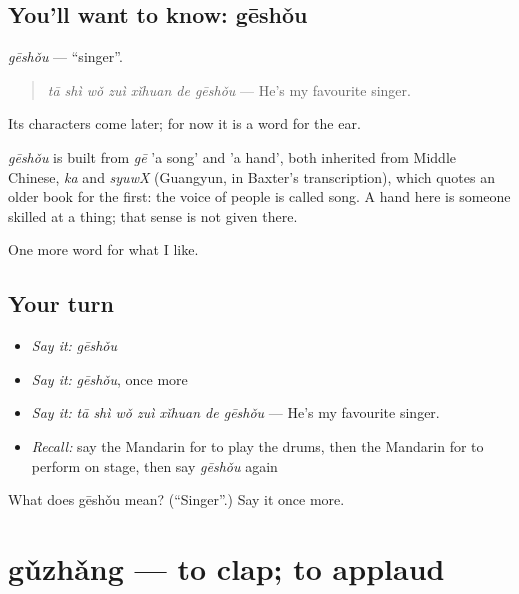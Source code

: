 \subsection*{You'll want to know: gēshǒu}
\emph{gēshǒu} — \textquotedblleft{}singer\textquotedblright{}.

\begin{quote}
\emph{tā shì wǒ zuì xǐhuan de gēshǒu} — He's my favourite singer.
\end{quote}

Its characters come later; for now it is a word for the ear.

\begin{cousinweb}
\emph{gēshǒu} is built from \emph{gē} 'a song' and  'a hand', both inherited from Middle Chinese, \emph{ka} and \emph{syuwX} (Guangyun, in Baxter's transcription), which quotes an older book for the first: the voice of people is called song. A hand here is someone skilled at a thing; that sense is not given there.
\end{cousinweb}

\begin{grammarlens}[title={What you've built}]
One more word for what I like.
\end{grammarlens}

\subsection*{Your turn}
\begin{itemize}
\raggedright
  \item \emph{Say it:} \emph{gēshǒu}
  \item \emph{Say it:} \emph{gēshǒu}, once more
  \item \emph{Say it:} \emph{tā shì wǒ zuì xǐhuan de gēshǒu} — He's my favourite singer.
  \item \emph{Recall:} say the Mandarin for to play the drums, then the Mandarin for to perform on stage, then say \emph{gēshǒu} again
\end{itemize}

\begin{tcolorbox}[breakable,colback=teal!4,colframe=teal!35!black,title={Before you move on}]
What does gēshǒu mean? (\textquotedblleft{}Singer\textquotedblright{}.) Say it once more.
\end{tcolorbox}
\section[gǔzhǎng]{gǔzhǎng — to clap; to applaud}

